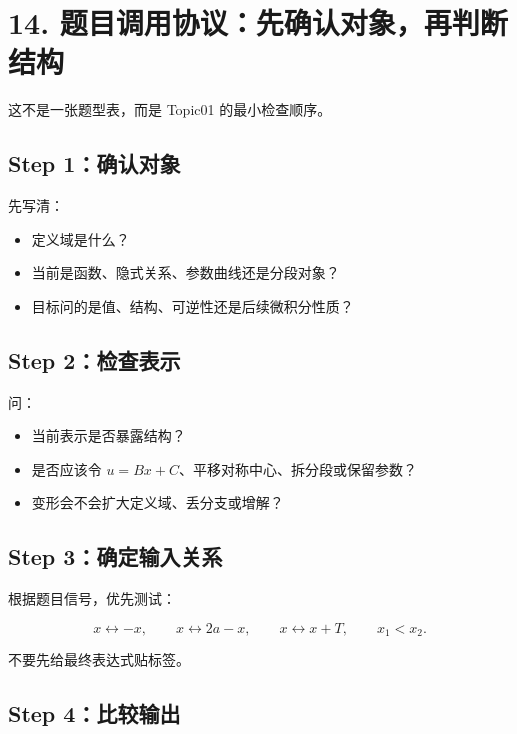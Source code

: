 \documentclass[11pt,a4paper]{ctexart}
\providecommand{\tightlist}{}
\begin{document}
\section{14.
题目调用协议：先确认对象，再判断结构}\label{ux9898ux76eeux8c03ux7528ux534fux8baeux5148ux786eux8ba4ux5bf9ux8c61ux518dux5224ux65adux7ed3ux6784}

这不是一张题型表，而是 Topic01 的最小检查顺序。

\subsection{Step 1：确认对象}\label{step-1ux786eux8ba4ux5bf9ux8c61}

先写清：

\begin{itemize}
\tightlist
\item
  定义域是什么？
\item
  当前是函数、隐式关系、参数曲线还是分段对象？
\item
  目标问的是值、结构、可逆性还是后续微积分性质？
\end{itemize}

\subsection{Step 2：检查表示}\label{step-2ux68c0ux67e5ux8868ux793a}

问：

\begin{itemize}
\tightlist
\item
  当前表示是否暴露结构？
\item
  是否应该令 \(u=Bx+C\)、平移对称中心、拆分段或保留参数？
\item
  变形会不会扩大定义域、丢分支或增解？
\end{itemize}

\subsection{Step
3：确定输入关系}\label{step-3ux786eux5b9aux8f93ux5165ux5173ux7cfb}

根据题目信号，优先测试：

\[
x\leftrightarrow -x,
\qquad
x\leftrightarrow 2a-x,
\qquad
x\leftrightarrow x+T,
\qquad
x_1<x_2.
\]

不要先给最终表达式贴标签。

\subsection{Step 4：比较输出}\label{step-4ux6bd4ux8f83ux8f93ux51fa}
\end{document}
